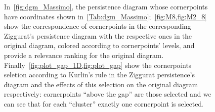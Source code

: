 \documentclass[english, LaM, oneside, noexaminfo]{sapthesis}
\begin{document}
\begin{figure}[tbp]
  \caption{In~\cref{fig:dgm_Massimo}, the persistence diagram whose cornerpoints have coordinates shown in~\cref{Tab:dgm_Massimo};~\cref{fig:M8,fig:M2_8} show the correspondence of cornerpoints in the corresponding Ziggurat's persistence diagram with the respective ones in the original diagram, colored according to cornerpoints' levels, and provide a relevance ranking for the original diagram. Finally~\cref{fig:plot_gap_1D,fig:plot_gap} show the cornerpoints seletion according to Kurlin's rule in the Ziggurat persistence's diagram and the effects of this selection on the original diagram respectively: cornerpoints ``above the gap'' are those selected and we can see that for each ``cluster'' exactly one cornerpoint is selected.}
  \label{fig:Label-figura-complessiva}
\end{figure}
\end{document}
